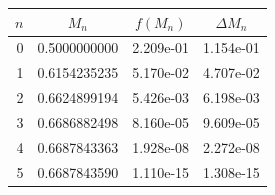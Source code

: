 \begin{tabular}{rccc}
\toprule
$n$ & $M_n$ & $f(M_n)$ & $\Delta M_n$ \\
\midrule
0 & 0.5000000000 & 2.209e-01 & 1.154e-01 \\
1 & 0.6154235235 & 5.170e-02 & 4.707e-02 \\
2 & 0.6624899194 & 5.426e-03 & 6.198e-03 \\
3 & 0.6686882498 & 8.160e-05 & 9.609e-05 \\
4 & 0.6687843363 & 1.928e-08 & 2.272e-08 \\
5 & 0.6687843590 & 1.110e-15 & 1.308e-15 \\
\bottomrule
\end{tabular}
